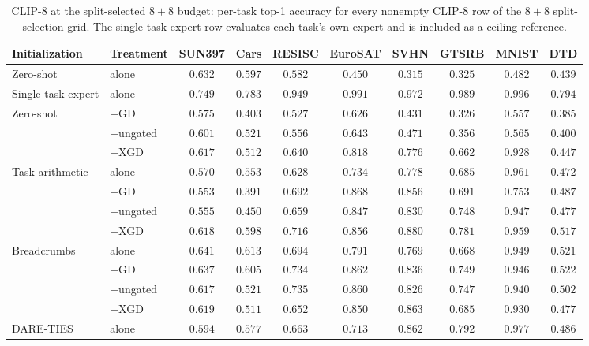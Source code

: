 \documentclass{article} %
\begin{document}
\begin{table}[p]
\centering
\scriptsize
\setlength{\tabcolsep}{2.5pt}
\renewcommand{\arraystretch}{0.92}
\caption{CLIP-8 at the split-selected $8{+}8$ budget: per-task top-1 accuracy for every nonempty CLIP-8 row of the $8{+}8$ split-selection grid. The single-task-expert row evaluates each task's own expert and is included as a ceiling reference.}
\label{tab:clip8-n8-pertask}
\begin{tabular}{llcccccccc}
\toprule
Initialization & Treatment & SUN397 & Cars & RESISC & EuroSAT & SVHN & GTSRB & MNIST & DTD \\
\midrule
Zero-shot & alone & $0.632$ & $0.597$ & $0.582$ & $0.450$ & $0.315$ & $0.325$ & $0.482$ & $0.439$ \\
Single-task expert & alone & $0.749$ & $0.783$ & $0.949$ & $0.991$ & $0.972$ & $0.989$ & $0.996$ & $0.794$ \\
\midrule
Zero-shot & $+$GD & $0.575$ & $0.403$ & $0.527$ & $0.626$ & $0.431$ & $0.326$ & $0.557$ & $0.385$ \\
          & $+$ungated & $0.601$ & $0.521$ & $0.556$ & $0.643$ & $0.471$ & $0.356$ & $0.565$ & $0.400$ \\
          & $+$XGD & $0.617$ & $0.512$ & $0.640$ & $0.818$ & $0.776$ & $0.662$ & $0.928$ & $0.447$ \\
\midrule
Task arithmetic & alone & $0.570$ & $0.553$ & $0.628$ & $0.734$ & $0.778$ & $0.685$ & $0.961$ & $0.472$ \\
                & $+$GD & $0.553$ & $0.391$ & $0.692$ & $0.868$ & $0.856$ & $0.691$ & $0.753$ & $0.487$ \\
                & $+$ungated & $0.555$ & $0.450$ & $0.659$ & $0.847$ & $0.830$ & $0.748$ & $0.947$ & $0.477$ \\
                & $+$XGD & $0.618$ & $0.598$ & $0.716$ & $0.856$ & $0.880$ & $0.781$ & $0.959$ & $0.517$ \\
\midrule
Breadcrumbs & alone & $0.641$ & $0.613$ & $0.694$ & $0.791$ & $0.769$ & $0.668$ & $0.949$ & $0.521$ \\
            & $+$GD & $0.637$ & $0.605$ & $0.734$ & $0.862$ & $0.836$ & $0.749$ & $0.946$ & $0.522$ \\
            & $+$ungated & $0.617$ & $0.521$ & $0.735$ & $0.860$ & $0.826$ & $0.747$ & $0.940$ & $0.502$ \\
            & $+$XGD & $0.619$ & $0.511$ & $0.652$ & $0.850$ & $0.863$ & $0.685$ & $0.930$ & $0.477$ \\
\midrule
DARE-TIES & alone & $0.594$ & $0.577$ & $0.663$ & $0.713$ & $0.862$ & $0.792$ & $0.977$ & $0.486$ \\

\end{tabular}
\end{table}
\end{document}
